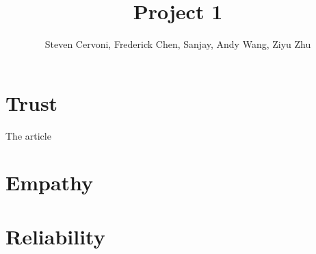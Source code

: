 \documentclass[11pt]{article}
\title{Project 1}
\author{Steven Cervoni, Frederick Chen, Sanjay, Andy Wang, Ziyu Zhu}
\begin{document}
\maketitle
\section{Trust}

The article \citep{siegel2009persuasive}

\section{Empathy}

\section{Reliability}



\end{document}
